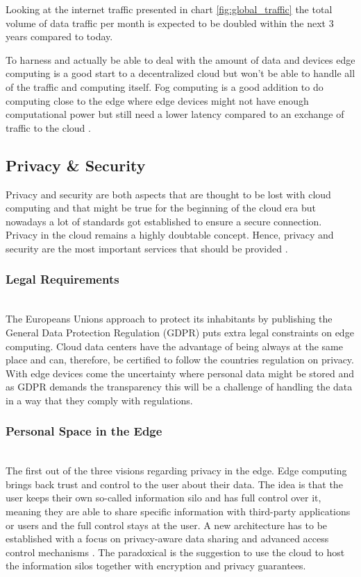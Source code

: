 Looking at the internet traffic presented in chart \ref{fig:global_traffic} the total volume of data traffic per month is expected to be doubled within the next 3 years compared to today.

To harness and actually be able to deal with the amount of data and devices edge computing is a good start to a decentralized cloud but won’t be able to handle all of the traffic and computing itself. Fog computing is a good addition to do computing close to the edge where edge devices might not have enough computational power but still need a lower latency compared to an exchange of traffic to the cloud \cite{7796149}.

\subsection{Privacy \& Security}
Privacy and security are both aspects that are thought to be lost with cloud computing and that might be true for the beginning of the cloud era but nowadays a lot of standards got established to ensure a secure connection. Privacy in the cloud remains a highly doubtable concept. Hence, privacy and security are the most important services that should be provided \cite{GarciaLopez:2015:ECV:2831347.2831354}.

\subsubsection{Legal Requirements}\hspace*{\fill} \\
The Europeans Unions approach to protect its inhabitants by publishing the General Data Protection Regulation (GDPR) puts extra legal constraints on edge computing.
Cloud data centers have the advantage of being always at the same place and can, therefore, be certified to follow the countries regulation on privacy.
With edge devices come the uncertainty where personal data might be stored and as GDPR \cite{eu01} demands the transparency this will be a challenge of handling the data in a way that they comply with regulations.

\subsubsection{Personal Space in the Edge}\hspace*{\fill} \\
The first out of the three visions regarding privacy in the edge.
Edge computing brings back trust and control to the user about their data. The idea is that the user keeps their own so-called information silo and has full control over it, meaning they are able to share specific information with third-party applications or users and the full control stays at the user.
A new architecture has to be established with a focus on privacy-aware data sharing and advanced access control mechanisms \cite{GarciaLopez:2015:ECV:2831347.2831354}.
The paradoxical is the suggestion to use the cloud to host the information silos together with encryption and privacy guarantees.


